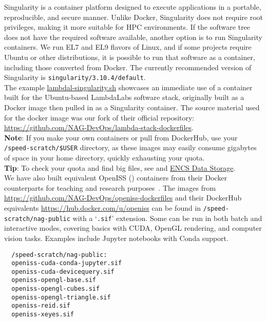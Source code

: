 Singularity is a container platform designed to execute applications in a portable, 
reproducible, and secure manner. Unlike Docker, Singularity does not require root privileges, 
making it more suitable for HPC environments. If the  software tree does not have 
the required software available, another option is to run Singularity containers. 
We run EL7 and EL9 flavors of Linux, and if some projects require Ubuntu or 
other distributions, it is possible to run that software as a container, 
including those converted from Docker. The currently recommended version of Singularity 
is \texttt{singularity/3.10.4/default}.\\

The example
\href{https://github.com/NAG-DevOps/speed-hpc/blob/master/src/lambdal-singularity.sh}{lambdal-singularity.sh}
showcases an immediate use of a container built for the Ubuntu-based LambdaLabs software stack, 
originally built as a Docker image then pulled in as a Singularity container. The source material
used for the docker image was our fork of their official repository: 
\url{https://github.com/NAG-DevOps/lambda-stack-dockerfiles}.\\

\noindent \textbf{Note}: If you make your own containers or pull from DockerHub,
use your \verb+/speed-scratch/$USER+ directory, as these images may easily 
consume gigabytes of space in your home directory, quickly exhausting your quota.\\

\noindent \textbf{Tip}: To check your quota and find big files, 
see  and
\href{https://www.concordia.ca/ginacody/aits/encs-data-storage.html}{ENCS Data Storage}.\\

We have also built equivalent OpenISS () containers from their Docker 
counterparts for teaching and research purposes~\cite{oi-containers-poster-siggraph2023}. 
The images from \url{https://github.com/NAG-DevOps/openiss-dockerfiles}
and their DockerHub equivalents \url{https://hub.docker.com/u/openiss} can be found in 
\verb+/speed-scratch/nag-public+ with a `\texttt{.sif}' extension.
Some can be run in both batch and interactive modes, covering basics with CUDA, OpenGL rendering, 
and computer vision tasks. Examples include Jupyter notebooks with Conda support.

\begin{verbatim}
  /speed-scratch/nag-public:
  openiss-cuda-conda-jupyter.sif
  openiss-cuda-devicequery.sif
  openiss-opengl-base.sif
  openiss-opengl-cubes.sif
  openiss-opengl-triangle.sif
  openiss-reid.sif
  openiss-xeyes.sif
\end{verbatim}

